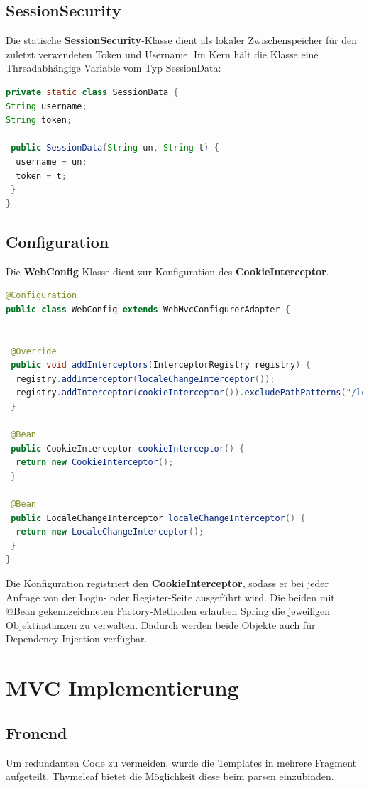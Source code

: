 \documentclass[
    a4paper
]{scrreprt}
\begin{document}
	\subsection{SessionSecurity}
	Die statische \textbf{SessionSecurity}-Klasse dient als lokaler Zwischenspeicher für den zuletzt verwendeten Token und Username. Im Kern hält die Klasse eine Threadabhängige Variable vom Typ SessionData:
	\begin{lstlisting}[language=java]
private static class SessionData {
String username;
String token;

 public SessionData(String un, String t) {
  username = un;
  token = t;
 }
}
	\end{lstlisting}
	
	\subsection{Configuration}
	Die \textbf{WebConfig}-Klasse dient zur Konfiguration des \textbf{CookieInterceptor}.
	\begin{lstlisting}[language=java]
@Configuration
public class WebConfig extends WebMvcConfigurerAdapter {


 @Override
 public void addInterceptors(InterceptorRegistry registry) {
  registry.addInterceptor(localeChangeInterceptor());
  registry.addInterceptor(cookieInterceptor()).excludePathPatterns("/login/**").excludePathPatterns("/registration/**").excludePathPatterns("/error/**");
 }

 @Bean
 public CookieInterceptor cookieInterceptor() {
  return new CookieInterceptor();
 }

 @Bean
 public LocaleChangeInterceptor localeChangeInterceptor() {
  return new LocaleChangeInterceptor();
 }
}
	\end{lstlisting}
	Die Konfiguration registriert den \textbf{CookieInterceptor}, sodass er bei jeder Anfrage von der Login- oder Register-Seite ausgeführt wird. Die beiden mit @Bean gekennzeichneten Factory-Methoden erlauben Spring die jeweiligen Objektinstanzen zu verwalten. Dadurch werden beide Objekte auch für Dependency Injection verfügbar.
	
    \section{MVC Implementierung}
    \subsection{Fronend}
	Um redundanten Code zu vermeiden, wurde die Templates in mehrere Fragment aufgeteilt. Thymeleaf bietet die Möglichkeit diese beim parsen einzubinden.
	
\end{document}
